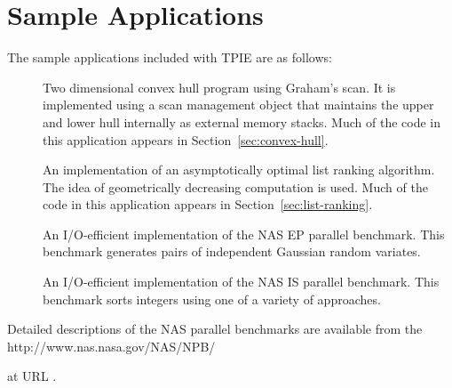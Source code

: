 \section{Sample Applications}

The sample applications included with TPIE are as follows:

\begin{description}
\item[] Two dimensional convex hull
  program using Graham's scan.  It is implemented using a scan
  management object that maintains the upper and lower hull internally
  as external memory stacks.  Much of the code in this application
  appears in Section~\ref{sec:convex-hull}.
\item[] An implementation of an asymptotically optimal list
  ranking  algorithm.  The idea of geometrically
  decreasing computation is used.  Much of the code in this
  application appears in Section~\ref{sec:list-ranking}.
\item[] An I/O-efficient implementation of the NAS EP
  parallel benchmark.  This benchmark generates pairs of independent
  Gaussian random variates.
\item[] An I/O-efficient implementation of the NAS IS
  parallel benchmark.  This benchmark sorts integers using one of a
  variety of approaches.
\end{description}

Detailed descriptions of the NAS parallel benchmarks are available
from the %
{http://www.nas.nasa.gov/NAS/NPB/}
\begin{latexonly}
at URL .
\end{latexonly}

